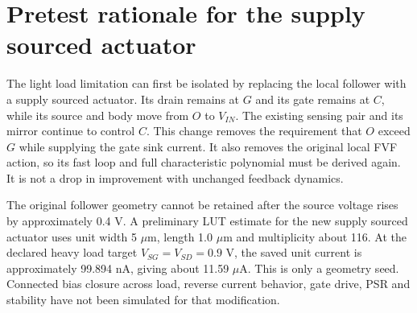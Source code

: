 \section{Pretest rationale for the supply sourced actuator}
The light load limitation can first be isolated by replacing the local
follower with a supply sourced actuator. Its drain remains at $G$ and
its gate remains at $C$, while its source and body move from $O$ to
$V_{IN}$. The existing sensing pair and its mirror continue to control
$C$. This change removes the requirement that $O$ exceed $G$ while
supplying the gate sink current. It also removes the original local
FVF action, so its fast loop and full characteristic polynomial must
be derived again. It is not a drop in improvement with unchanged
feedback dynamics.

The original follower geometry cannot be retained after the source
voltage rises by approximately 0.4 V. A preliminary LUT estimate for
the new supply sourced actuator uses unit width 5 $\mu$m, length
1.0 $\mu$m and multiplicity about 116. At the declared heavy load
target $V_{SG}=V_{SD}=0.9$ V, the saved unit current is approximately
99.894 nA, giving about 11.59 $\mu$A. This is only a geometry seed.
Connected bias closure across load, reverse current behavior, gate
drive, PSR and stability have not been simulated for that modification.

